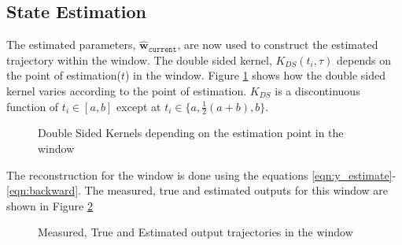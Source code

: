 \documentclass[letterpaper%
, twoside%
, 12pt%
,memoire%
, english%
,creativecommons,hyperref%
]{thETS}
\theoremstyle{newThmStyle}
\begin{document}
\FloatBarrier
\subsection{State Estimation}
The estimated parameters, $\hat{\textbf{w}}_{\texttt{current}}$, are now used to construct the estimated trajectory within the window. The double sided kernel, $K_{DS}(t_i,\tau)$ depends on the point of estimation($t$) in the window. Figure \ref{Fig:kernels} shows how the double sided kernel varies according to the point of estimation. $K_{DS}$ is a discontinuous function of $t_i\in[a,b]$ except at $t_i\in \{a, \frac{1}{2}(a+b), b\}$. 
\begin{figure} [H]
	\centering	{}
	\parbox{0.75\textwidth}{\caption{Double Sided Kernels depending on the estimation point in the window\label{Fig:kernels}}}
\end{figure}
The reconstruction for the window is done using the equations \eqref{eqn:y_estimate}-\eqref{eqn:backward}. The measured, true and estimated outputs for this window are shown in Figure \ref{Fig:winEst}
\begin{figure}
	\centering	{}
	\parbox{0.75\textwidth}{\caption{Measured, True and Estimated output trajectories in the window\label{Fig:winEst}}}
\end{figure}
\end{document}
